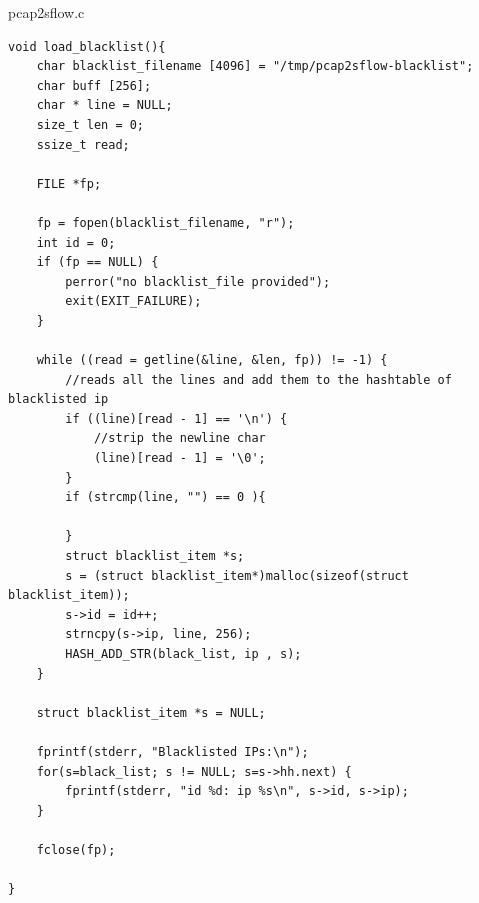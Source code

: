 \documentclass[12pt,a4paper,openright,twoside]{report}
\begin{document}
pcap2sflow.c
\begin{verbatim}
void load_blacklist(){
    char blacklist_filename [4096] = "/tmp/pcap2sflow-blacklist";
    char buff [256];
    char * line = NULL;
    size_t len = 0;
    ssize_t read;

    FILE *fp;

    fp = fopen(blacklist_filename, "r");
    int id = 0;
    if (fp == NULL) {
        perror("no blacklist_file provided");
        exit(EXIT_FAILURE);
    }

    while ((read = getline(&line, &len, fp)) != -1) {
        //reads all the lines and add them to the hashtable of blacklisted ip
        if ((line)[read - 1] == '\n') {
            //strip the newline char
            (line)[read - 1] = '\0';
        }
        if (strcmp(line, "") == 0 ){

        }
        struct blacklist_item *s;
        s = (struct blacklist_item*)malloc(sizeof(struct blacklist_item));
        s->id = id++;
        strncpy(s->ip, line, 256);
        HASH_ADD_STR(black_list, ip , s);
    }

    struct blacklist_item *s = NULL;

    fprintf(stderr, "Blacklisted IPs:\n");
    for(s=black_list; s != NULL; s=s->hh.next) {
        fprintf(stderr, "id %d: ip %s\n", s->id, s->ip);
    }

    fclose(fp);

}
\end{verbatim}
\end{document}
